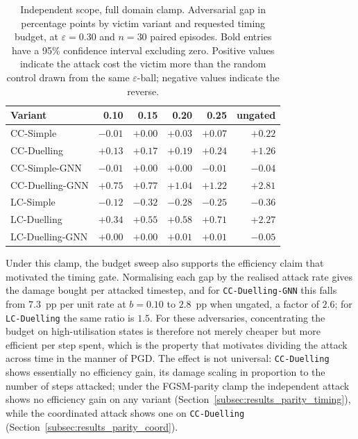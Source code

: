 \begin{table}[htbp]
  \centering
  \caption{Independent scope, full domain clamp. Adversarial gap in percentage points
           by victim variant and requested timing budget, at $\varepsilon = 0.30$ and
           $n = 30$ paired episodes. Bold entries have a 95\% confidence interval
           excluding zero. Positive values indicate the attack cost the victim more
           than the random control drawn from the same $\varepsilon$-ball; negative values indicate
           the reverse.}
  \label{tab:gap_sweep_independent}
  \begin{tabular}{lrrrrr}
    \hline
    \textbf{Variant} & \textbf{0.10} & \textbf{0.15} & \textbf{0.20} & \textbf{0.25} & \textbf{ungated} \\
    \hline
    CC-Simple        & $-0.01$ & $+0.00$ & $+0.03$ & $\mathbf{+0.07}$ & $\mathbf{+0.22}$ \\
    CC-Duelling      & $+0.13$ & $+0.17$ & $+0.19$ & $+0.24$ & $\mathbf{+1.26}$ \\
    CC-Simple-GNN    & $-0.01$ & $+0.00$ & $+0.00$ & $-0.01$ & $-0.04$ \\
    CC-Duelling-GNN  & $\mathbf{+0.75}$ & $\mathbf{+0.77}$ & $\mathbf{+1.04}$ & $\mathbf{+1.22}$ & $\mathbf{+2.81}$ \\
    LC-Simple        & $-0.12$ & $-0.32$ & $-0.28$ & $-0.25$ & $-0.36$ \\
    LC-Duelling      & $\mathbf{+0.34}$ & $\mathbf{+0.55}$ & $\mathbf{+0.58}$ & $\mathbf{+0.71}$ & $\mathbf{+2.27}$ \\
    LC-Duelling-GNN  & $+0.00$ & $+0.00$ & $+0.01$ & $+0.01$ & $-0.05$ \\
    \hline
  \end{tabular}
\end{table}

Under this clamp, the budget sweep also supports the efficiency claim that motivated
the timing gate.
Normalising each gap by the realised attack rate gives the damage bought per
attacked timestep, and for \texttt{CC-Duelling-GNN} this falls from $7.3$~pp per
unit rate at $b = 0.10$ to $2.8$~pp when ungated, a factor of $2.6$; for
\texttt{LC-Duelling} the same ratio is $1.5$. For these adversaries, concentrating the
budget on high-utilisation states is therefore not merely cheaper but more efficient
per step spent, which is the property that motivates dividing the attack across time
in the manner of PGD. The effect is not universal: \texttt{CC-Duelling} shows
essentially no efficiency gain, its damage scaling in proportion to the number of steps
attacked; under the FGSM-parity clamp the independent attack shows no efficiency gain
on any variant (Section~\ref{subsec:results_parity_timing}), while the coordinated
attack shows one on \texttt{CC-Duelling} (Section~\ref{subsec:results_parity_coord}).

